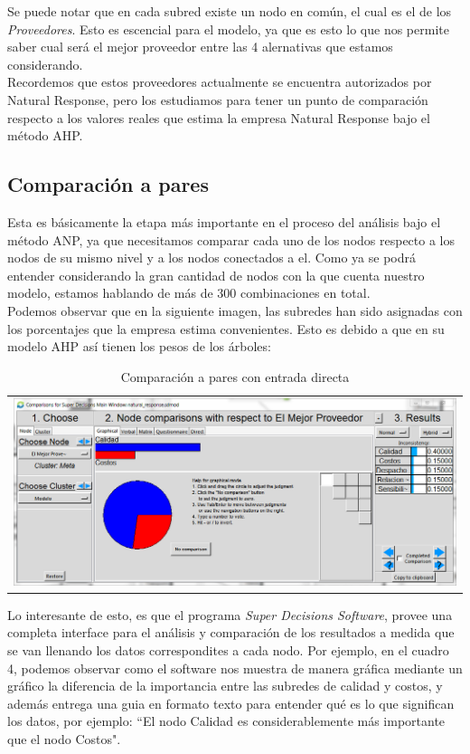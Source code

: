 \documentclass[12pt,twocolumn]{article}
\begin{document}
Se puede notar que en cada subred existe un nodo en común, el cual es el de los \textit{Proveedores}. Esto es escencial para el modelo, ya que es esto lo que nos permite saber cual será el mejor proveedor entre las 4 alernativas que estamos considerando.\\
Recordemos que estos proveedores actualmente se encuentra autorizados por Natural Response, pero los estudiamos para tener un punto de comparación respecto a los valores reales que estima la empresa Natural Response bajo el método AHP.
\newpage
\subsection{Comparación a pares}
Esta es básicamente la etapa más importante en el proceso del análisis bajo el método ANP, ya que necesitamos comparar cada uno de los nodos respecto a los nodos de su mismo nivel y a los nodos conectados a el. Como ya se podrá entender considerando la gran cantidad de nodos con la que cuenta nuestro modelo, estamos hablando de más de 300 combinaciones en total.\\

Podemos observar que en la siguiente imagen, las subredes han sido asignadas con los porcentajes que la empresa estima convenientes. Esto es debido a que en su modelo AHP así tienen los pesos de los árboles:

\begin{table}[h]
\centering
\begin{tabular}{c}
\includegraphics[width=\textwidth]{img/3.PNG}
\end{tabular}
\caption{Comparación a pares con entrada directa}
\label{tab:comparacion entrada directa}
\end{table}

Lo interesante de esto, es que el programa \textit{Super Decisions Software}, provee una completa interface para el análisis y comparación de los resultados a medida que se van llenando los datos correspondites a cada nodo. Por ejemplo, en el cuadro 4, podemos observar como el software nos muestra de manera gráfica mediante un gráfico la diferencia de la importancia entre las subredes de calidad y costos, y además entrega una guia en formato texto para entender qué es lo que significan los datos, por ejemplo: ``El nodo Calidad es considerablemente más importante que el nodo Costos".
\end{document}
